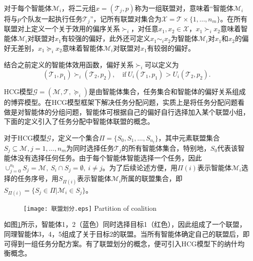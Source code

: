 \begin{definition}[偏好关系]
	对于每个智能体$\mathcal{M}_i$，将二元组$x=(\mathcal{T}_j,p)$称为一组联盟对，意味着“智能体$\mathcal{M}_i$将与$p$个队友一起执行任务$\mathcal{T}_j$”，记所有联盟对集合为$\mathcal{X}=\mathcal{T}\times\{1,\dots,n_m\}$。在所有联盟对上定义一个关于效用的偏序关系$\succ_i$，对任意$x_1,x_2 \in \mathcal{X}$，$x_1 \succ_i x_2$意味着智能体$\mathcal{M}_i$对联盟对$x_1$有较强的偏好，此外还可定义$x_1 \sim_i x_2$为智能体$\mathcal{M}_i$对$x_1$和$x_2$的偏好无差别，$x_1 \succeq_i x_2$意味着智能体$\mathcal{M}_i$对联盟对$x_1$有较弱的偏好。
\end{definition}

结合之前定义的智能体效用函数，偏好关系$\succ_i$可以定义为
\begin{equation}
\label{hcg:eq:preference}
	(\mathcal{T}_1,p_1) \succ_i (\mathcal{T}_2,p_2),\quad \text{if}\ U_i(\mathcal{T}_1,p_1) > U_i(\mathcal{T}_2,p_2).
\end{equation}

HCG模型$\mathcal{G}=(\mathcal{M},\mathcal{T},\succeq_i)$是由智能体集合，任务集合和智能体的偏好关系组成的博弈模型。在HCG模型框架下解决任务分配问题，实质上是将任务分配问题看做是对智能体的分组问题，智能体可根据自己的偏好自行选择加入某个联盟小组，下面的定义引入了任务分配中智能体联盟的概念。


\begin{definition}[联盟划分]
	对于HCG模型$\mathcal{G}$，定义一个集合$\Pi = \{S_0,S_1,\dots,S_{n_t}\}$，其中元素联盟集合$S_j \subseteq \mathcal{M},j=1,\dots,n_m$为同时选择任务$\mathcal{T}_j$的所有智能体集合，特别地，$S_0$代表该智能体没有选择任何任务。由于每个智能体智能选择一个任务，因此$\cup_{j=0}^{n_t} S_j = \mathcal{M},\ S_i \cap S_j =\emptyset,\ i \neq j$。为了后续论述方便，用$\Pi(i)$表示智能体$\mathcal{M}_i$选择的任务序号，用$S_{\Pi(i)}$表示智能体$\mathcal{M}_i$所属的联盟集合，即$S_{\Pi(i)}=\{S_j \in \Pi|\mathcal{M}_i \in S_j\}$。
\end{definition}

\begin{figure}[!htp]
  \centering
  \texttt{[image: 联盟划分.eps]}
    {Partition of coalition}
  \label{fig:partition}
\end{figure}

如图\ref{fig:partition}所示，智能体1，2（蓝色）同时选择目标1（红色），因此组成了一个联盟，同理智能体3，4，5组成了关于目标2的联盟。当所有智能体确定自己的联盟后，即可得到一组任务分配方案。有了联盟划分的概念，便可引入HCG模型下的纳什均衡概念。

